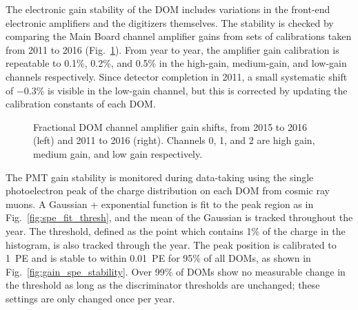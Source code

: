 The electronic gain stability of the DOM includes variations in the
front-end electronic amplifiers and the digitizers themselves.  The
stability is checked by comparing the Main Board channel amplifier gains
from sets of calibrations taken from 2011 to 2016
(Fig.~\ref{fig:domcal_ch_gain}).  From year to year, the amplifier gain 
calibration is repeatable to 0.1\%, 0.2\%, and 0.5\% in the high-gain,
medium-gain, and low-gain channels respectively.  Since detector completion
in 2011, a small systematic shift of $-0.3\%$ is visible in the low-gain
channel, but this is corrected by updating the calibration constants of
each DOM.

\begin{figure}[!h]
  \captionsetup[subfigure]{labelformat=empty}
  \centering
  \caption{Fractional DOM channel amplifier gain shifts, from 2015 to
    2016 (left) and 2011 to 2016 (right).  Channels 0, 1, and 2 are
    high gain, medium gain, and low gain respectively.}
  \label{fig:domcal_ch_gain}
\end{figure}

The PMT gain stability is monitored during data-taking using the
single photoelectron peak of the charge distribution on each DOM from
cosmic ray muons. A
Gaussian + exponential function is fit to the peak region as in
Fig.~\ref{fig:spe_fit_thresh}, and the mean of the Gaussian is
tracked throughout the year. The threshold, defined as the point which
contains 1\% of the charge in the histogram, is also tracked through
the year. The peak position is calibrated to 1~PE
and is stable to within 0.01~PE for 95\% of all DOMs, as shown in
Fig.~\ref{fig:gain_spe_stability}. Over 99\% of DOMs show no
measurable change in the threshold as long as the discriminator
thresholds are unchanged; these settings are only changed once per year.

